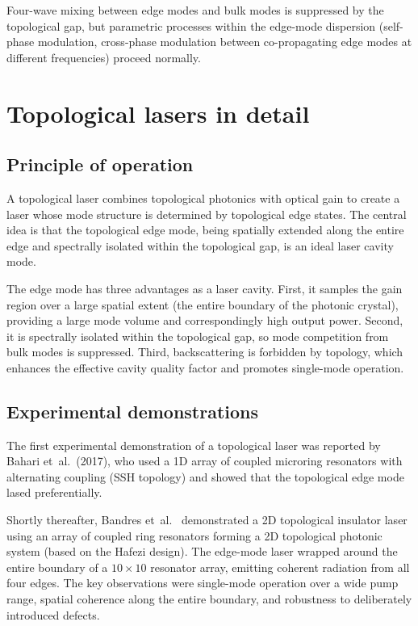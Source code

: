 Four-wave mixing between edge modes and bulk modes is suppressed by
the topological gap, but parametric processes within the edge-mode
dispersion (self-phase modulation, cross-phase modulation between
co-propagating edge modes at different frequencies) proceed normally.

\section{Topological lasers in detail}
\label{sec:ch18-lasers}

\subsection{Principle of operation}
\label{sec:ch18-laser-principle}

A topological laser combines topological photonics with optical gain
to create a laser whose mode structure is determined by topological
edge states.  The central idea is that the topological edge mode, being
spatially extended along the entire edge and spectrally isolated within
the topological gap, is an ideal laser cavity mode.

The edge mode has three advantages as a laser cavity.  First, it samples
the gain region over a large spatial extent (the entire boundary of the
photonic crystal), providing a large mode volume and correspondingly
high output power.  Second, it is spectrally isolated within the
topological gap, so mode competition from bulk modes is suppressed.
Third, backscattering is forbidden by topology, which enhances the
effective cavity quality factor and promotes single-mode operation.

\subsection{Experimental demonstrations}
\label{sec:ch18-laser-demos}

The first experimental demonstration of a topological laser was
reported by Bahari et~al.\ (2017), who used a 1D array of coupled
microring resonators with alternating coupling (SSH topology) and
showed that the topological edge mode lased preferentially.

Shortly thereafter, Bandres et~al.\ \cite{bandres2018topologicala} demonstrated a 2D
topological insulator laser using an array of coupled ring resonators
forming a 2D topological photonic system (based on the Hafezi design).
The edge-mode laser wrapped around the entire boundary of a
$10\times 10$ resonator array, emitting coherent radiation from all
four edges.  The key observations were single-mode operation over a wide
pump range, spatial coherence along the entire boundary, and robustness
to deliberately introduced defects.

